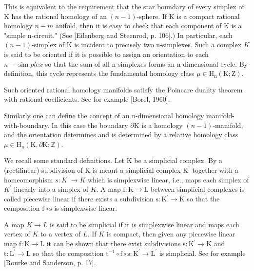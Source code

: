 \documentclass[10pt]{article}
\begin{document}
This is equivalent to the requirement that the star boundary of every simplex of $\mathrm{K}$ has the rational homology of an $(n-1)$-sphere. If $\mathrm{K}$ is a compact rational homology $n-m$ anifold, then it is easy to check that each component of $\mathrm{K}$ is a "simple n-circuit." (See [Eilenberg and Steenrod, p. 106].) In particular, each $(n-1)$-simplex of $\mathrm{K}$ is incident to precisely two n-simplexes. Such a complex $K$ is said to be oriented if it is possible to assign an orientation to each $n-\operatorname{sim} p l e x$ so that the sum of all n-simplexes forms an n-dimensional cycle. By definition, this cycle represents the fundamental homology class $\mu \in \mathrm{H}_{\mathrm{n}}(\mathrm{K} ; \mathrm{Z})$.

Such oriented rational homology manifolds satisfy the Poincare duality theorem with rational coefficients. See for example [Borel, 1960].

Similarly one can define the concept of an n-dimensional homology manifold-with-boundary. In this case the boundary $\partial \mathrm{K}$ is a homology $(n-1)$-manifold, and the orientation determines and is determined by a relative homology class $\mu \in \mathrm{H}_{\mathrm{n}}(\mathrm{K}, \partial \mathrm{K} ; \mathbb{Z})$.

We recall some standard definitions. Let $\mathrm{K}$ be a simplicial complex. By a (rectilinear) subdivision of $\mathrm{K}$ is meant a simplicial complex $\mathrm{K}^{\prime}$ together with a homeomorphism $s: K^{\prime} \rightarrow K$ which is simplexwise linear, i.e., maps each simplex of $K^{\prime}$ linearly into a simplex of $K$. A map $\mathrm{f}: \mathrm{K} \rightarrow \mathrm{L}$ between simplicial complexes is called piecewise linear if there exists a subdivision $\mathrm{s}: \mathrm{K}^{\prime} \rightarrow \mathrm{K}$ so that the composition $\mathrm{f} \circ \mathrm{s}$ is simplexwise linear.

A map $K \rightarrow L$ is said to be simplicial if it is simplexwise linear and maps each vertex of $K$ to a vertex of $L$. If $K$ is compact, then given any piecewise linear map $\mathrm{f}: \mathrm{K} \rightarrow \mathrm{L}$ it can be shown that there exist subdivisions $\mathrm{s}: \mathrm{K}^{\prime} \rightarrow \mathrm{K}$ and $\mathrm{t}: \mathrm{L}^{\prime} \rightarrow \mathrm{L}$ so that the composition $\mathrm{t}^{-1} \circ \mathrm{f} \circ \mathrm{s}: \mathrm{K}^{\prime} \rightarrow \mathrm{L}^{\prime}$ is simplicial. See for example [Rourke and Sanderson, p. 17].
\end{document}
